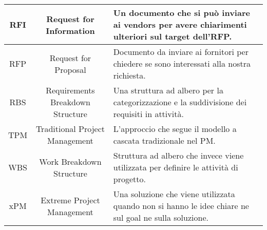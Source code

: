 \begin{tabularx}{\textwidth}{|c|c|X|}
	\hline
	RFI & Request for Information & Un documento che si può inviare ai vendors per avere chiarimenti ulteriori sul target dell'RFP. \\
	\hline
	RFP & Request for Proposal & Documento da inviare ai fornitori per chiedere se sono interessati alla nostra richiesta. \\
	\hline
	RBS & Requirements Breakdown Structure & Una struttura ad albero per la categorizzazione e la suddivisione dei requisiti in attività. \\
	\hline
	TPM & Traditional Project Management & L'approccio che segue il modello a cascata tradizionale nel PM. \\
	\hline
	WBS & Work Breakdown Structure & Struttura ad albero che invece viene utilizzata per definire le attività di progetto.\\
	\hline
	xPM & Extreme Project Management &  Una soluzione che viene utilizzata quando non si hanno le idee chiare ne sul goal ne sulla soluzione.\\
	\hline
\end{tabularx}

